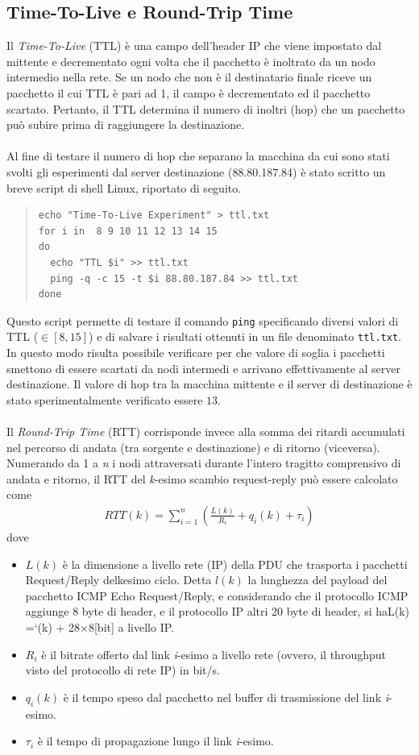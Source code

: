 \documentclass[a4paper,10pt]{article}
\begin{document}
\newpage
\subsection{Time-To-Live e Round-Trip Time}
Il \textit{Time-To-Live} (TTL) è una campo dell'header IP che viene impostato dal mittente e decrementato ogni volta che il pacchetto è inoltrato da un nodo intermedio nella rete. Se un nodo che non è il destinatario finale riceve un pacchetto il cui TTL è pari ad 1, il campo è decrementato ed il pacchetto scartato. Pertanto, il TTL determina il numero di inoltri (hop) che un pacchetto può subire prima di raggiungere la destinazione.\\\\
Al fine di testare il numero di hop che separano la macchina da cui sono stati svolti gli esperimenti dal server destinazione (88.80.187.84) è stato scritto un breve script di shell Linux, riportato di seguito.
\begin{quote}
\begin{verbatim}
echo "Time-To-Live Experiment" > ttl.txt
for i in  8 9 10 11 12 13 14 15 
do
  echo "TTL $i" >> ttl.txt
  ping -q -c 15 -t $i 88.80.187.84 >> ttl.txt
done
\end{verbatim}
\end{quote}
Questo script permette di testare il comando \texttt{ping} specificando diversi valori di TTL ($\in[8, 15]$) e di salvare i risultati ottenuti in un file denominato \texttt{ttl.txt}. In questo modo risulta possibile verificare per che valore di soglia i pacchetti smettono di essere scartati da nodi intermedi e arrivano effettivamente al server destinazione. Il valore di hop tra la macchina mittente e il server di destinazione è stato sperimentalmente verificato essere \textbf{$13$}.\\\\
Il \textit{Round-Trip Time} (RTT) corrisponde invece alla somma dei ritardi accumulati nel percorso di andata (tra sorgente e destinazione) e di ritorno (viceversa). Numerando da 1 a \textit{n} i nodi attraversati durante l'intero tragitto comprensivo di andata e ritorno, il RTT del \textit{k}-esimo scambio request-reply può essere calcolato come
\begin{align*}
RTT(k) = \sum_{i=1}^{n} \left( \frac{L(k)}{R_i} + q_i(k) + \tau_i \right)
\end{align*}
dove
\begin{itemize}
\item $L(k)$ è la dimensione a livello rete (IP) della PDU che trasporta i pacchetti Request/Reply delkesimo ciclo.  Detta $l(k)$ la lunghezza del payload del pacchetto ICMP Echo Request/Reply, e considerando che il protocollo ICMP aggiunge 8 byte di header, e il protocollo IP altri 20 byte di header, si haL(k) =`(k) + 28×8[bit] a livello IP.
\item $R_i$ è il bitrate offerto dal link \textit{i}-esimo a livello rete (ovvero, il throughput visto del protocollo di rete IP) in bit/s.
\item $q_i(k)$ è il tempo speso dal pacchetto nel buffer di trasmissione del link \textit{i}-esimo.
\item $\tau_i$ è il tempo di propagazione lungo il link \textit{i}-esimo.
\end{itemize}
\end{document}
